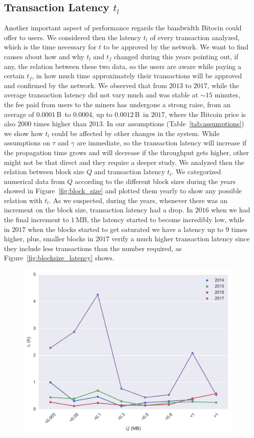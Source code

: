 \documentclass[USenglish]{uit-thesis}
\def\bitcoin{\leavevmode\rlap{\hskip.5pt-}B}
\begin{document}
\subsection{Transaction Latency $t_l$}
\label{sec:txslatency}
Another important aspect of performance
regards the bandwidth Bitocin could offer to users.
We considered then the latency $t_l$ of every
transaction analyzed, which is the time necessary for
$t$ to be approved by the network. We want to find
causes about how and why $t_l$ and $t_f$
changed during this years pointing out, if any,
the relation between these two data, so the
users are aware while paying a certain $t_f$, in how much
time approximately their transactions will be approved
and confirmed by the network.
We observed that from $2013$ to $2017$, while the average
transaction latency did not vary much and was stable
at $\sim$$15$ minutes, the fee paid from users to the miners
has undergone a strong raise, from an average of $0.0001$\,\bitcoin~to
$0.0004$, up to $0.0012$\,\bitcoin~in $2017$, where the Bitcoin price is
also $2000$ times higher than $2013$. In our assumptions (Table~\ref{tab:assumptions})
we show how $t_l$ could be affected by other changes in the system.
While assumptions on $\tau$ and $\gamma$ are immediate,
so the transaction latency will increase if the
propagation time grows and will decrease if the throughput
gets higher, other might not be that direct and they require
a deeper study. We analyzed then the relation between
block size $Q$ and transaction latency $t_l$. We categorized
numerical data from $Q$ according to the different block
sizes during the years showed in Figure~\ref{fig:block_size}
and plotted them yearly to show
any possible relation with $t_l$.
As we suspected, during the years,
whenever there was an increment on the block size, transaction
latency had a drop. In $2016$ when we had the final
increment to $1$\,MB, the latency started
to become incredibly low, while in $2017$ when the blocks
started to get saturated we have a latency up to
$9$ times higher, plus, smaller blocks in $2017$ verify
a much higher transaction latency since they include less
transactions than the number required, as
Figure~\ref{fig:blocksize_latency} shows.
\begin{figure}[h]
	\centering
	\includegraphics[width=1\textwidth]{img/blocksize_latency}

\end{figure}$$
\end{document}
